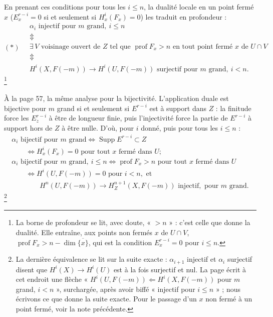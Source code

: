\documentclass[11pt,a4paper]{article}
\begin{document}
En prenant ces conditions pour tous les $i \leq n$, la dualité locale en un
point fermé $x$ ($E^{r-i}_x = 0$ si et seulement si $H^i_x(F_x) = 0$) les
traduit en profondeur :
\[
(*) \quad
\begin{array}{l}
  \alpha_i \text{ injectif pour } m \text{ grand},\ i \leq n \\
  \Updownarrow \\
  \exists\, V \text{ voisinage ouvert de } Z \text{ tel que } \operatorname{prof} F_x > n \text{ en tout point fermé } x \text{ de } U \cap V \\
  \Updownarrow \\
  H^i(X, F(-m)) \to H^i(U, F(-m)) \text{ surjectif pour } m \text{ grand},\ i < n .
\end{array}
\]
\footnote{La borne de profondeur se lit, avec doute, « $> n$ » : c'est celle
que donne la dualité. Elle entraîne, aux points non fermés $x$ de $U \cap V$,
$\operatorname{prof} F_x > n - \dim \overline{\lbrace x \rbrace}$, qui est la
condition $E^{r-i}_x = 0$ pour $i \leq n$.}

À la page 57, la même analyse pour la bijectivité. L'application duale est
bijective pour $m$ grand si et seulement si $E^{r-i}$ est à support dans
$Z$ : la finitude force les $E^{r-i}_z$ à être de longueur finie, puis
l'injectivité force la partie de $E^{r-i}$ à support hors de $Z$ à être nulle.
D'où, pour $i$ donné, puis pour tous les $i \leq n$ :
\[
\begin{array}{l}
  \alpha_i \text{ bijectif pour } m \text{ grand} \iff \operatorname{Supp} E^{r-i} \subset Z \\
  \qquad \iff H^i_x(F_x) = 0 \text{ pour tout } x \text{ fermé dans } U ; \\[1ex]
  \alpha_i \text{ bijectif pour } m \text{ grand},\ i \leq n
  \iff \operatorname{prof} F_x > n \text{ pour tout } x \text{ fermé dans } U \\
  \qquad \iff H^i(U, F(-m)) = 0 \text{ pour } i < n, \text{ et} \\
  \qquad\qquad H^n(U, F(-m)) \to H^{n+1}_Z(X, F(-m)) \text{ injectif}, \text{ pour } m \text{ grand.}
\end{array}
\]
\footnote{La dernière équivalence se lit sur la suite exacte : $\alpha_{i+1}$
injectif et $\alpha_i$ surjectif disent que $H^i(X) \to H^i(U)$ est à la fois
surjectif et nul. La page écrit à cet endroit une flèche
« $H^i(U, F(-m)) \Leftarrow H^i(X, F(-m))$ pour $m$ grand, $i < n$ », surchargée,
après avoir biffé « injectif pour $i \leq n$ » ; nous écrivons ce que donne la
suite exacte. Pour le passage d'un $x$ non fermé à un point fermé, voir la
note précédente.}
\end{document}
